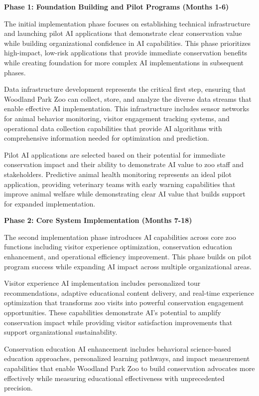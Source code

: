 \documentclass[
  Letterpaper,
]{scrbook}
\begin{document}
\textbf{Phase 1: Foundation Building and Pilot Programs (Months 1-6)}

The initial implementation phase focuses on establishing technical
infrastructure and launching pilot AI applications that demonstrate
clear conservation value while building organizational confidence in AI
capabilities. This phase prioritizes high-impact, low-risk applications
that provide immediate conservation benefits while creating foundation
for more complex AI implementations in subsequent phases.

Data infrastructure development represents the critical first step,
ensuring that Woodland Park Zoo can collect, store, and analyze the
diverse data streams that enable effective AI implementation. This
infrastructure includes sensor networks for animal behavior monitoring,
visitor engagement tracking systems, and operational data collection
capabilities that provide AI algorithms with comprehensive information
needed for optimization and prediction.

Pilot AI applications are selected based on their potential for
immediate conservation impact and their ability to demonstrate AI value
to zoo staff and stakeholders. Predictive animal health monitoring
represents an ideal pilot application, providing veterinary teams with
early warning capabilities that improve animal welfare while
demonstrating clear AI value that builds support for expanded
implementation.

\textbf{Phase 2: Core System Implementation (Months 7-18)}

The second implementation phase introduces AI capabilities across core
zoo functions including visitor experience optimization, conservation
education enhancement, and operational efficiency improvement. This
phase builds on pilot program success while expanding AI impact across
multiple organizational areas.

Visitor experience AI implementation includes personalized tour
recommendations, adaptive educational content delivery, and real-time
experience optimization that transforms zoo visits into powerful
conservation engagement opportunities. These capabilities demonstrate
AI's potential to amplify conservation impact while providing visitor
satisfaction improvements that support organizational sustainability.

Conservation education AI enhancement includes behavioral science-based
education approaches, personalized learning pathways, and impact
measurement capabilities that enable Woodland Park Zoo to build
conservation advocates more effectively while measuring educational
effectiveness with unprecedented precision.
\end{document}
